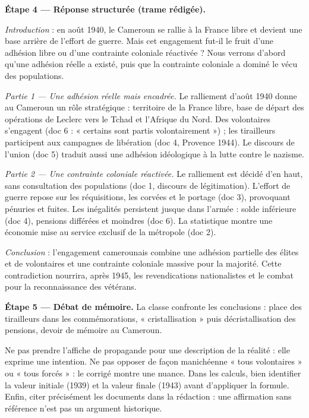 \documentclass[11pt]{article}
\newcommand{\cle}[1]{{\popxbold\color{popdark}#1}}
\begin{document}
\begin{exoresolu}
\textbf{Étape 4 — Réponse structurée (trame rédigée).}

\emph{Introduction} : en août 1940, le Cameroun se rallie à la France libre et devient une base arrière de l'effort de guerre. Mais cet engagement fut-il le fruit d'une adhésion libre ou d'une contrainte coloniale réactivée ? Nous verrons d'abord qu'une adhésion réelle a existé, puis que la contrainte coloniale a dominé le vécu des populations.

\emph{Partie 1 — Une adhésion réelle mais encadrée.} Le ralliement d'août 1940 donne au Cameroun un rôle stratégique : territoire de la France libre, base de départ des opérations de Leclerc vers le Tchad et l'Afrique du Nord. Des volontaires s'engagent (doc 6 : « certains sont partis volontairement ») ; les tirailleurs participent aux campagnes de libération (doc 4, Provence 1944). Le discours de l'union (doc 5) traduit aussi une adhésion idéologique à la lutte contre le nazisme.

\emph{Partie 2 — Une contrainte coloniale réactivée.} Le ralliement est décidé d'en haut, sans consultation des populations (doc 1, discours de légitimation). L'effort de guerre repose sur les réquisitions, les corvées et le portage (doc 3), provoquant pénuries et fuites. Les inégalités persistent jusque dans l'armée : solde inférieure (doc 4), pensions différées et moindres (doc 6). La statistique montre une économie mise au service exclusif de la métropole (doc 2).

\emph{Conclusion} : l'engagement camerounais combine une adhésion partielle des élites et de volontaires et une contrainte coloniale massive pour la majorité. Cette contradiction nourrira, après 1945, les revendications nationalistes et le combat pour la reconnaissance des vétérans.

\textbf{Étape 5 — Débat de mémoire.} La classe confronte les conclusions : place des tirailleurs dans les commémorations, « cristallisation » puis décristallisation des pensions, devoir de mémoire au Cameroun.
\end{exoresolu}

\begin{attention}
Ne pas prendre l'affiche de propagande pour une description de la réalité : elle exprime une \cle{intention}. Ne pas opposer de façon manichéenne « tous volontaires » ou « tous forcés » : le corrigé montre une nuance. Dans les calculs, bien identifier la valeur initiale (1939) et la valeur finale (1943) avant d'appliquer la formule. Enfin, citer précisément les documents dans la rédaction : une affirmation sans référence n'est pas un argument historique.
\end{attention}
\end{document}
